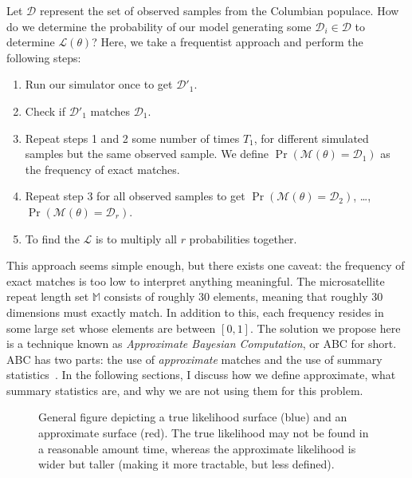 Let $\mathcal{D}$ represent the set of observed samples from the Columbian populace.
How do we determine the probability of our model generating some $\mathcal{D}_i \in \mathcal{D}$ to
determine $\mathcal{L}(\theta)$?
Here, we take a frequentist approach and perform the following steps:
\begin{enumerate}
    \item Run our simulator once to get $\mathcal{D}'_1$.
    \item Check if $\mathcal{D}'_1$ matches $\mathcal{D}_1$.
    \item Repeat steps 1 and 2 some number of times $T_1$, for different simulated samples but the same
        observed sample.
        We define $\Pr\left( \mathcal{M}(\theta) = \mathcal{D}_1 \right)$ as the frequency of exact matches.
    \item Repeat step 3 for all observed samples to get $\Pr\left( \mathcal{M}(\theta) = \mathcal{D}_2 \right)$,
        \ldots, $\Pr\left( \mathcal{M}(\theta) = \mathcal{D}_r \right)$.
    \item To find the $\mathcal{L}$ is to multiply all $r$ probabilities together.
\end{enumerate}

This approach seems simple enough, but there exists one caveat: the frequency of exact matches is too low to interpret
anything meaningful.
The microsatellite repeat length set $\mathbb{M}$ consists of roughly 30 elements, meaning that roughly 30 dimensions
must exactly match.
In addition to this, each frequency resides in some large set whose elements are between $[0, 1]$.
The solution we propose here is a technique known as \emph{Approximate Bayesian Computation}, or ABC for short.
ABC has two parts: the use of \emph{approximate} matches and the use of summary
statistics~\cite{lintusaariFundamentalsRecentDevelopments2017}.
In the following sections, I discuss how we define approximate, what summary statistics are, and why we are not using
them for this problem.

\begin{figure}[t]
    \centering{}
    \caption{General figure depicting a true likelihood surface (blue) and an approximate surface (red).
    The true likelihood may not be found in a reasonable amount time, whereas the approximate likelihood is wider but
    taller (making it more tractable, but less defined).
    }\label{fig:approximateLikelihood}
\end{figure}

